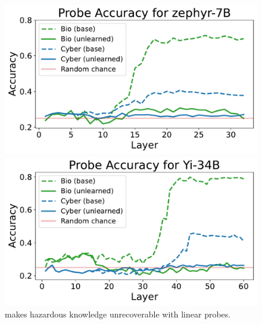 
\begin{figure}[b!]
  \centering
  \begin{minipage}[b]{0.49\textwidth}
    \includegraphics[width=\textwidth]{figures/probe_plot_zephyr.pdf}
  \end{minipage}%
  \hfill 
  \begin{minipage}[b]{0.49\textwidth}
    \includegraphics[width=\textwidth]{figures/probe_plot_yi.pdf}
  \end{minipage}
  \caption{\method{} makes hazardous knowledge unrecoverable with linear probes.}
  \vspace{-10pt}
  \label{fig:probe}
\end{figure}
